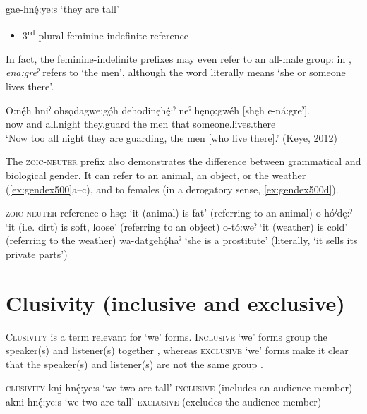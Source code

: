 \ea\label{ex:gendex300} gae-hnę́:ye:s ‘they are tall’\\
\begin{itemize}
    \item 3\textsuperscript{rd} plural feminine-indefinite reference\\
\end{itemize}
\z

In fact, the feminine-indefinite prefixes may even refer to an all-male group: in  , \textit{ena:greˀ} refers to ‘the men’, although the word literally means ‘she or someone lives there’.

\ea\label{ex:gendex400} 
\gll O:nę́h hniˀ ohsǫdagwe:gǫ́h de̱hodinęhę́:ˀ neˀ hęnǫ:gwéh [shęh e-ná:greˀ]. \\
now and all.night they.guard the men that someone.lives.there\\
\glt ‘Now too all night they are guarding, the men [who live there].’ (Keye, 2012)
\z

The \textsc{zoic-neuter} prefix also demonstrates the difference between grammatical and biological gender. It can refer to an animal, an object, or the weather  (\ref{ex:gendex500}a--c), and to females (in a derogatory sense, \ref{ex:gendex500d}). 

\ea\label{ex:gendex500} \textsc{zoic-neuter} reference
\ea\label{ex:gendex500a} o-hsę: ‘it (animal) is fat’ (referring to an animal)
\ex\label{ex:gendex500b} o-hóˀdę:ˀ ‘it (i.e. dirt) is soft, loose’ (referring to an object)
\ex\label{ex:gendex500c} o-tó:weˀ ‘it (weather) is cold’ (referring to the weather)
\ex\label{ex:gendex500d} wa-datgehǫ́haˀ ‘she is a prostitute’ (literally, ‘it sells its private parts’)
\z
\z


\section{Clusivity (inclusive and exclusive)} \label{Clusivity}
\textsc{Clusivity} is a term relevant for ‘we’ forms. \textsc{Inclusive} ‘we’ forms group the speaker(s) and listener(s) together , whereas \textsc{exclusive} ‘we’ forms make it clear that the speaker(s) and listener(s) are not the same group . 

\ea\label{ex:clusex100} \textsc{clusivity}
\ea\label{ex:clusex100a} kni̱-hnę́:ye:s ‘we two are tall’ \textsc{inclusive} (includes an audience member)
\ex\label{ex:clusex100b} akni-hnę́:ye:s ‘we two are tall’ \textsc{exclusive} (excludes the audience member)
\z
\z


